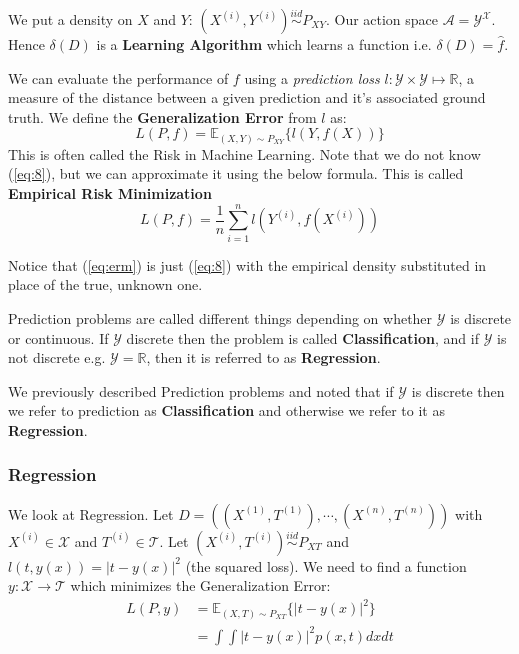 \documentclass[]{article}
\theoremstyle{mattstyle}
\theoremstyle{definition}
\begin{document}
We put a density on $X$ and $Y$: $(X^{(i)},Y^{(i)}) \overset{iid}{\sim} P_{XY}$. Our action space $\mathcal{A} = \mathcal{Y}^\mathcal{X}$. Hence \(\delta(D)\) is a \textbf{Learning Algorithm} which learns a function i.e. $\delta(D) = \hat{f}$. 

We can evaluate the performance of $f$ using a \emph{prediction loss} $l: \mathcal{Y} \times \mathcal{Y} \mapsto \mathbb{R}$, a measure of the distance between a given prediction and it’s associated ground truth. We define the \textbf{Generalization Error} from $l$ as:
\begin{equation}\label{eq:8}
L(P,f) = \mathbb{E}_{(X,Y)\sim P_{XY}}\{l(Y,f(X)) \}
\end{equation}
This is often called the Risk in Machine Learning. Note that we do not know (\ref{eq:8}), but we can approximate it using the below formula. This is called \textbf{Empirical Risk Minimization}
\begin{equation}\label{eq:erm}
L(P,f) = \frac{1}{n}\sum_{i=1}^n l\left(Y^{(i)},f(X^{(i)})\right)
\end{equation}

Notice that (\ref{eq:erm}) is just (\ref{eq:8}) with the empirical density substituted in place of the true, unknown one.

Prediction problems are called different things depending on whether $\mathcal{Y}$ is discrete or continuous. If $\mathcal{Y}$ discrete then the problem is called \textbf{Classification}, and if $\mathcal{Y}$ is not discrete e.g. $\mathcal{Y} = \mathbb{R}$, then it is referred to as \textbf{Regression}.

We previously described Prediction problems and noted that if $\mathcal{Y}$ is discrete then we refer to prediction as \textbf{Classification} and otherwise we refer to it as \textbf{Regression}. 

\subsubsection{Regression}
We look at Regression. Let $D=((X^{(1)},T^{(1)}), \cdots, (X^{(n)},T^{(n)}))$ with $X^{(i)} \in \mathcal{X}$ and $T^{(i)} \in \mathcal{T}$. Let $(X^{(i)},T^{(i)}) \overset{iid}{\sim} P_{XT}$ and $l(t, y(x)) = | t - y(x) |^2$ (the squared loss).
We need to find a function $y: \mathcal{X} \rightarrow \mathcal{T}$ which minimizes the Generalization Error:
\begin{align*}
L(P,y) &= \mathbb{E}_{(X,T)\sim P_{XT}}\{| t - y(x) |^2\}\\
&= \int \int | t - y(x) |^2 p(x, t) dx dt
\end{align*}
\end{document}
